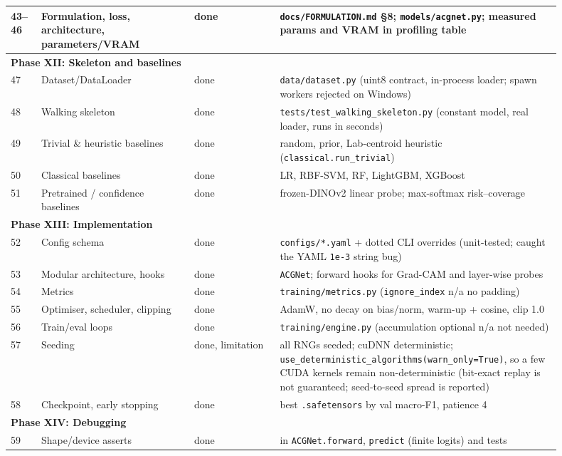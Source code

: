 \begin{longtable}{p{0.05\linewidth}p{0.25\linewidth}p{0.14\linewidth}p{0.46\linewidth}}
43--46 & Formulation, loss, architecture, parameters/VRAM & done & \texttt{docs/FORMULATION.md} \S{}8; \texttt{models/acgnet.py}; measured params and VRAM in profiling table \\
\midrule\multicolumn{4}{l}{\textbf{Phase XII: Skeleton and baselines}}\\\midrule
47 & Dataset/DataLoader & done & \texttt{data/dataset.py} (uint8 contract, in-process loader; spawn workers rejected on Windows) \\
48 & Walking skeleton & done & \texttt{tests/test\_walking\_skeleton.py} (constant model, real loader, runs in seconds) \\
49 & Trivial \& heuristic baselines & done & random, prior, Lab-centroid heuristic (\texttt{classical.run\_trivial}) \\
50 & Classical baselines & done & LR, RBF-SVM, RF, LightGBM, XGBoost \\
51 & Pretrained / confidence baselines & done & frozen-DINOv2 linear probe; max-softmax risk--coverage \\
\midrule\multicolumn{4}{l}{\textbf{Phase XIII: Implementation}}\\\midrule
52 & Config schema & done & \texttt{configs/*.yaml} + dotted CLI overrides (unit-tested; caught the YAML \texttt{1e-3} string bug) \\
53 & Modular architecture, hooks & done & \texttt{ACGNet}; forward hooks for Grad-CAM and layer-wise probes \\
54 & Metrics & done & \texttt{training/metrics.py} (\texttt{ignore\_index} n/a no padding) \\
55 & Optimiser, scheduler, clipping & done & AdamW, no decay on bias/norm, warm-up + cosine, clip 1.0 \\
56 & Train/eval loops & done & \texttt{training/engine.py} (accumulation optional n/a not needed) \\
57 & Seeding & done, limitation & all RNGs seeded; cuDNN deterministic; \texttt{use\_deterministic\_algorithms(warn\_only=True)}, so a few CUDA kernels remain non-deterministic (bit-exact replay is not guaranteed; seed-to-seed spread is reported) \\
58 & Checkpoint, early stopping & done & best \texttt{.safetensors} by val macro-F1, patience 4 \\
\midrule\multicolumn{4}{l}{\textbf{Phase XIV: Debugging}}\\\midrule
59 & Shape/device asserts & done & in \texttt{ACGNet.forward}, \texttt{predict} (finite logits) and tests \\

\end{longtable}
